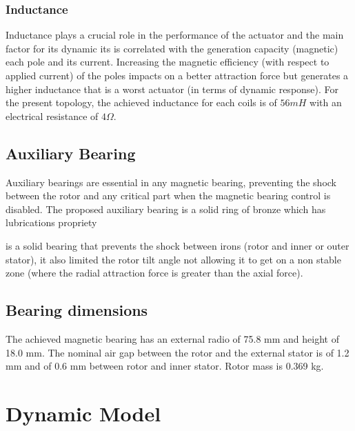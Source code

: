 \documentclass[10pt,fleqn,a4paper,twoside]{article}
\begin{document}
	
	
	\subsubsection{Inductance} \label{subsec:at:indutancia}
	
	Inductance plays a crucial role in the performance of the actuator and the main factor for its dynamic its is correlated with the generation capacity (magnetic) each pole and its current. Increasing the magnetic efficiency (with respect to applied current) of the poles impacts on a better attraction force but generates a higher inductance that is a worst actuator (in terms of dynamic response). For the present topology, the achieved inductance for each coils is of $56 mH$ with an electrical resistance of $4 \Omega$. 
	
	
	\subsection{Auxiliary Bearing}
	
	Auxiliary bearings are essential in any magnetic bearing, preventing the shock between the rotor and any critical part when the magnetic bearing control is disabled. The proposed auxiliary bearing is a solid ring of bronze which has lubrications propriety 
	
	
	is a solid bearing that prevents the shock between irons (rotor and inner or outer stator), it also limited the rotor tilt angle not allowing it to get on a non stable zone (where the radial attraction force is greater than the axial force).
	
	\subsection{Bearing dimensions}
	
	The achieved magnetic bearing has an external radio of 75.8 mm and height of 18.0 mm. The nominal air gap between the rotor and the external stator is of 1.2 mm and of 0.6 mm between rotor and inner stator. Rotor mass is 0.369 kg.
	
	
	\section{Dynamic Model}
	
\end{document}
